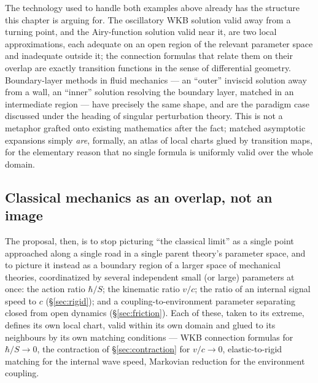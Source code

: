The technology used to handle both examples above already has the structure
this chapter is arguing for. The oscillatory WKB solution valid away from a
turning point, and the Airy-function solution valid near it, are two local
approximations, each adequate on an open region of the relevant parameter space
and inadequate outside it; the connection formulas that relate them on their
overlap are exactly transition functions in the sense of differential geometry.
Boundary-layer methods in fluid mechanics --- an ``outer'' inviscid solution
away from a wall, an ``inner'' solution resolving the boundary layer, matched
in an intermediate region --- have precisely the same shape, and are the
paradigm case discussed under the heading of singular perturbation theory. This
is not a metaphor grafted onto existing mathematics after the fact; matched
asymptotic expansions simply \emph{are}, formally, an atlas of local charts
glued by transition maps, for the elementary reason that no single formula is
uniformly valid over the whole domain.

\subsection{Classical mechanics as an overlap, not an image}

The proposal, then, is to stop picturing ``the classical limit'' as a single
point approached along a single road in a single parent theory's parameter
space, and to picture it instead as a boundary region of a larger space of
mechanical theories, coordinatized by several independent small (or large)
parameters at once: the action ratio $\hbar/S$; the kinematic ratio $v/c$; the
ratio of an internal signal speed to $c$ (\S\ref{sec:rigid}); and a
coupling-to-environment parameter separating closed from open dynamics
(\S\ref{sec:friction}). Each of these, taken to its extreme, defines its own
local chart, valid within its own domain and glued to its neighbours by its own
matching conditions --- WKB connection formulas for $\hbar/S\to 0$, the
contraction of \S\ref{sec:contraction} for $v/c\to 0$, elastic-to-rigid
matching for the internal wave speed, Markovian reduction for the environment
coupling.


